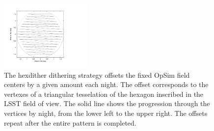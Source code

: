 \documentclass[]{spie}  %
\begin{document}
\begin{figure}
\centering
\includegraphics[width=0.4\textwidth]{figures/dither_vert}
\caption[]
{\label{fig:vertices}
The hexdither dithering strategy offsets the fixed OpSim field centers
by a given amount each night. The offset corresponds to the vertexes
of a triangular tesselation of the hexagon inscribed in the LSST field
of view. The solid line shows the progression through the vertices by
night, from the lower left to the upper right. The offsets repeat
after the entire pattern is completed. }
\end{figure}
\end{document}

